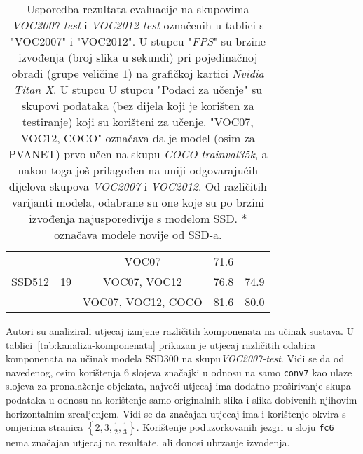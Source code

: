 \documentclass[utf8, diplomski, numeric, lmodern]{fer}
\begin{document}
\begin{table}[htbp]
\begin{tabular}{|c|c|c|c|c|}
		\multirow{3}{*}{SSD512} 
		& \multirow{3}{*}{19} 
		  & \footnotesize{VOC07} & 71.6 & - \\ \cline{3-5}
		& & \footnotesize{VOC07, VOC12} & 76.8 & 74.9 \\ \cline{3-5}
		& & \footnotesize{VOC07, VOC12, COCO} & 81.6 & 80.0 \\ \hline
	\end{tabular}
	\caption{Usporedba rezultata evaluacije na skupovima \emph{VOC2007-test} i \emph{VOC2012-test} označenih u tablici s "VOC2007" i "VOC2012". U stupcu "\emph{FPS}" su brzine izvođenja (broj slika u sekundi) pri pojedinačnoj obradi (grupe veličine $1$) na grafičkoj kartici \emph{Nvidia Titan X}. U stupcu U stupcu "Podaci za učenje" su skupovi podataka (bez dijela koji je korišten za testiranje) koji su korišteni za učenje. "{\footnotesize{VOC07, VOC12, COCO}}" označava da je model (osim za PVANET) prvo učen na skupu \emph{COCO-trainval35k}, a nakon toga još prilagođen na uniji odgovarajućih dijelova skupova \emph{VOC2007} i \emph{VOC2012}. Od različitih varijanti modela, odabrane su one koje su po brzini izvođenja najusporedivije s modelom SSD. * označava modele novije od SSD-a.\cite{ssd,pvanet,yolov2}}
	\label{tab:rezultati-usporedba-map}
\end{table}

Autori su analizirali utjecaj izmjene različitih komponenata na učinak sustava. U tablici~\ref{tab:kanaliza-komponenata} prikazan je utjecaj različitih odabira komponenata na učinak modela SSD300 na skupu\emph{VOC2007-test}. Vidi se da od navedenog, osim korištenja $6$ slojeva značajki u odnosu na samo \texttt{conv7} kao ulaze slojeva za pronalaženje objekata, najveći utjecaj ima dodatno proširivanje skupa podataka u odnosu na korištenje samo originalnih slika i slika dobivenih njihovim horizontalnim zrcaljenjem. Vidi se da značajan utjecaj ima i korištenje okvira s omjerima stranica $\left\{2,3,\frac{1}{2},\frac{1}{3}\right\}$. Korištenje poduzorkovanih jezgri u sloju \texttt{fc6} nema značajan utjecaj na rezultate, ali donosi ubrzanje izvođenja.
\end{document}
